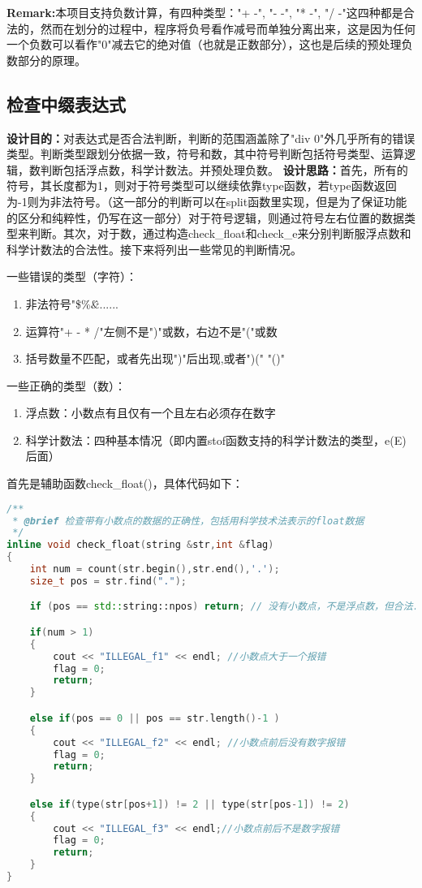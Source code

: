 \documentclass[fontset=fandol]{ctexart}
\begin{document}
\textbf{Remark:}本项目支持负数计算，有四种类型："+ -", "- -", "* -", "/ -"这四种都是合法的，然而在划分的过程中，程序将负号看作减号而单独分离出来，这是因为任何一个负数可以看作"0"减去它的绝对值（也就是正数部分），这也是后续的预处理负数部分的原理。

\subsection{检查中缀表达式}
\textbf{设计目的：}对表达式是否合法判断，判断的范围涵盖除了"div 0"外几乎所有的错误类型。判断类型跟划分依据一致，符号和数，其中符号判断包括符号类型、运算逻辑，数判断包括浮点数，科学计数法。并预处理负数。
\textbf{设计思路：}首先，所有的符号，其长度都为1，则对于符号类型可以继续依靠type函数，若type函数返回为-1则为非法符号。（这一部分的判断可以在split函数里实现，但是为了保证功能的区分和纯粹性，仍写在这一部分）对于符号逻辑，则通过符号左右位置的数据类型来判断。其次，对于数，通过构造check\_float和check\_e来分别判断服浮点数和科学计数法的合法性。接下来将列出一些常见的判断情况。

一些错误的类型（字符）：
\begin{enumerate}
    \item 非法符号"\@\$\%\^\&......
    \item 运算符"+ - * /"左侧不是")"或数，右边不是"("或数
    \item 括号数量不匹配，或者先出现")"后出现,或者")(" "()"
\end{enumerate}

一些正确的类型（数）：
\begin{enumerate}
    \item 浮点数：小数点有且仅有一个且左右必须存在数字
    \item 科学计数法：四种基本情况（即内置stof函数支持的科学计数法的类型，e(E)后面） 
\end{enumerate}

首先是辅助函数check\_float()，具体代码如下：
\begin{lstlisting}[language=C++, caption={check\_float()}]
/**
 * @brief 检查带有小数点的数据的正确性，包括用科学技术法表示的float数据
 */
inline void check_float(string &str,int &flag)
{
    int num = count(str.begin(),str.end(),'.');
    size_t pos = str.find(".");

    if (pos == std::string::npos) return; // 没有小数点，不是浮点数，但合法.这一步为了判断科学计数法数据而设计

    if(num > 1) 
    {
        cout << "ILLEGAL_f1" << endl; //小数点大于一个报错
        flag = 0;
        return;
    }

    else if(pos == 0 || pos == str.length()-1 )
    {
        cout << "ILLEGAL_f2" << endl; //小数点前后没有数字报错
        flag = 0;
        return;
    }

    else if(type(str[pos+1]) != 2 || type(str[pos-1]) != 2)
    {
        cout << "ILLEGAL_f3" << endl;//小数点前后不是数字报错
        flag = 0;
        return;
    }
}    
\end{lstlisting}
\end{document}
